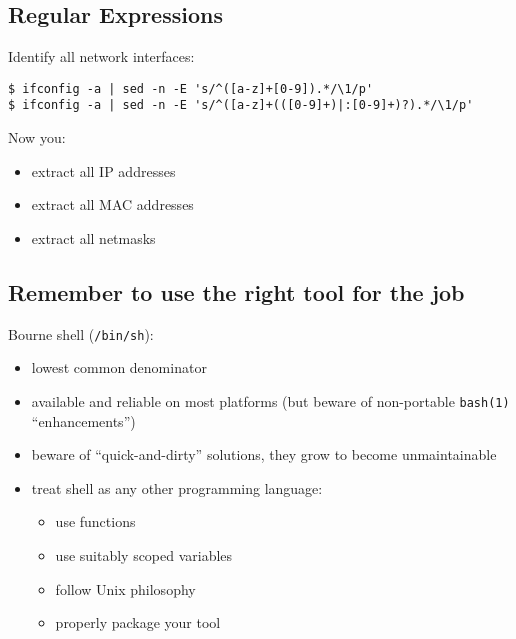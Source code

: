 \documentclass[xga]{xdvislides}
\begin{document}
\subsection{Regular Expressions}
Identify all network interfaces:
\begin{verbatim}
$ ifconfig -a | sed -n -E 's/^([a-z]+[0-9]).*/\1/p'
$ ifconfig -a | sed -n -E 's/^([a-z]+(([0-9]+)|:[0-9]+)?).*/\1/p'
\end{verbatim}
\vspace{.5in}
Now you:
\begin{itemize}
	\item extract all IP addresses
	\item extract all MAC addresses
	\item extract all netmasks
\end{itemize}

\subsection{Remember to use the right tool for the job}
Bourne shell ({\tt /bin/sh}):
\begin{itemize}
	\item lowest common denominator
	\item available and reliable on most platforms (but beware of
		non-portable {\tt bash(1)} ``enhancements'')
	\item beware of ``quick-and-dirty'' solutions, they grow to become
		unmaintainable
	\item treat shell as any other programming language:
		\begin{itemize}
			\item use functions
			\item use suitably scoped variables
			\item follow Unix philosophy
			\item properly package your tool
		\end{itemize}
\end{itemize}
\end{document}
